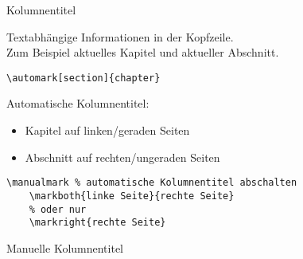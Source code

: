 \begin{Frame}[fragile]{Kolumnentitel}
  \begin{Definition}
    Textabhängige Informationen in der Kopfzeile.\\
    Zum Beispiel aktuelles Kapitel und aktueller Abschnitt.
  \end{Definition}

  \xxx

  \begin{lstlisting}[gobble=4]
    \automark[section]{chapter}
  \end{lstlisting}
  Automatische Kolumnentitel:
  \begin{itemize}
    \item Kapitel auf linken/geraden Seiten
    \item Abschnitt auf rechten/ungeraden Seiten
  \end{itemize}
  

  \xxx

  \begin{lstlisting}[gobble=4]
    \manualmark % automatische Kolumnentitel abschalten
    \markboth{linke Seite}{rechte Seite}
    % oder nur
    \markright{rechte Seite}
  \end{lstlisting}
  Manuelle Kolumnentitel
\end{Frame}

